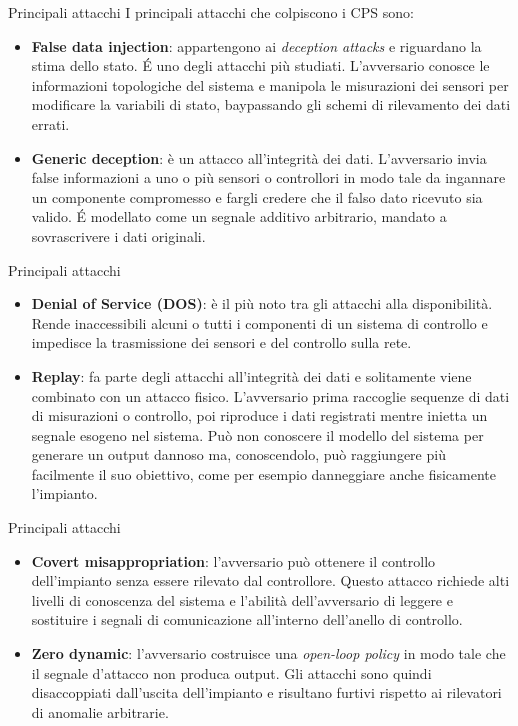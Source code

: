 \documentclass{beamer}
\begin{document}
\begin{frame}{Principali attacchi}
I principali attacchi che colpiscono i CPS sono:
\begin{itemize}
    \item \textbf{False data injection}: appartengono ai \textit{deception attacks} e riguardano la stima dello stato. \'E uno degli attacchi più studiati. 
    L'avversario conosce le informazioni topologiche del sistema e manipola le misurazioni dei sensori per modificare la variabili di stato, 
    baypassando gli schemi di rilevamento dei dati errati.
    \item \textbf{Generic deception}: è un attacco all'integrità dei dati. L'avversario invia false informazioni a uno o più sensori o controllori 
    in modo tale da ingannare un componente compromesso e fargli credere che il falso dato ricevuto sia valido.
    \'E modellato come un segnale additivo arbitrario, mandato a sovrascrivere i dati originali.
\end{itemize}
\end{frame}

\begin{frame}{Principali attacchi}
\begin{itemize}
    \item \textbf{Denial of Service (DOS)}: è il più noto tra gli attacchi alla disponibilità. Rende inaccessibili alcuni o tutti i componenti di un 
    sistema di controllo e impedisce la trasmissione dei sensori e del controllo sulla rete.
    \item \textbf{Replay}: fa parte degli attacchi all'integrità dei dati e solitamente viene combinato con un attacco fisico. L'avversario prima 
    raccoglie sequenze di dati di misurazioni o controllo, poi riproduce i dati registrati mentre inietta un segnale esogeno nel sistema. 
    Può non conoscere il modello del sistema per generare un output dannoso ma, conoscendolo, può raggiungere più facilmente il suo obiettivo, 
    come per esempio danneggiare anche fisicamente l'impianto.
\end{itemize}
\end{frame}

\begin{frame}{Principali attacchi}
\begin{itemize}
    \item \textbf{Covert misappropriation}: l'avversario può ottenere il controllo dell'impianto senza essere rilevato dal controllore. 
    Questo attacco richiede alti livelli di conoscenza del sistema e l'abilità dell'avversario di leggere e sostituire i segnali di comunicazione  
    all'interno dell'anello di controllo.
    \item \textbf{Zero dynamic}: l'avversario costruisce una \textit{open-loop policy} in modo tale che il segnale d'attacco non produca output. 
    Gli attacchi sono quindi disaccoppiati dall'uscita dell'impianto e risultano furtivi rispetto ai rilevatori di anomalie arbitrarie. 
\end{itemize}
\end{frame}
\end{document}
